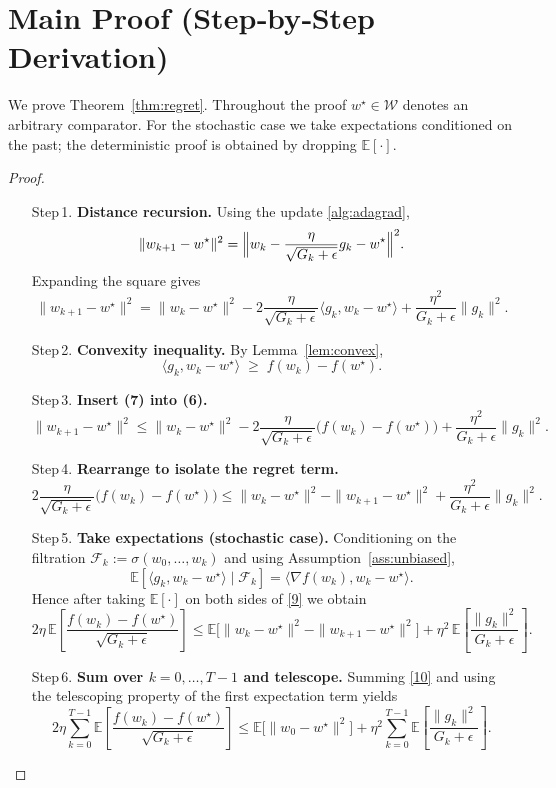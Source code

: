 \documentclass[11pt]{article}
\newcommand{\E}{\mathbb{E}}
\begin{document}
\section*{Main Proof (Step‑by‑Step Derivation)}
We prove Theorem~\ref{thm:regret}. Throughout the proof $w^{\star}\in\mathcal{W}$ denotes an arbitrary comparator.
For the stochastic case we take expectations conditioned on the past; the deterministic proof is obtained by dropping $\E[\cdot]$.

\begin{proof}
\begin{enumerate}
\item[Step 1.] \textbf{Distance recursion.}
Using the update \eqref{alg:adagrad},
\[
\|w_{k+1}-w^{\star}\|^{2}
= \Bigl\|w_k-\frac{\eta}{\sqrt{G_k+\epsilon}}g_k-w^{\star}\Bigr\|^{2}.
\]
Expanding the square gives
\[
\|w_{k+1}-w^{\star}\|^{2}
= \|w_k-w^{\star}\|^{2}
-2\frac{\eta}{\sqrt{G_k+\epsilon}}\langle g_k,w_k-w^{\star}\rangle
+\frac{\eta^{2}}{G_k+\epsilon}\|g_k\|^{2}.
\tag{6}
\]

\item[Step 2.] \textbf{Convexity inequality.}
By Lemma~\ref{lem:convex},
\[
\langle g_k,w_k-w^{\star}\rangle
\;\ge\;
f(w_k)-f(w^{\star}).
\tag{7}
\]

\item[Step 3.] \textbf{Insert (7) into (6).}
\[
\|w_{k+1}-w^{\star}\|^{2}
\le \|w_k-w^{\star}\|^{2}
-2\frac{\eta}{\sqrt{G_k+\epsilon}}\bigl(f(w_k)-f(w^{\star})\bigr)
+\frac{\eta^{2}}{G_k+\epsilon}\|g_k\|^{2}.
\tag{8}
\]

\item[Step 4.] \textbf{Rearrange to isolate the regret term.}
\[
2\frac{\eta}{\sqrt{G_k+\epsilon}}\bigl(f(w_k)-f(w^{\star})\bigr)
\le
\|w_k-w^{\star}\|^{2}
-\|w_{k+1}-w^{\star}\|^{2}
+\frac{\eta^{2}}{G_k+\epsilon}\|g_k\|^{2}.
\tag{9}
\]

\item[Step 5.] \textbf{Take expectations (stochastic case).}
Conditioning on the filtration $\mathcal{F}_k:=\sigma(w_0,\dots,w_k)$ and using
Assumption~\ref{ass:unbiased},
\[
\E\!\left[\langle g_k,w_k-w^{\star}\rangle\mid\mathcal{F}_k\right]
= \langle \nabla f(w_k),w_k-w^{\star}\rangle .
\]
Hence after taking $\E[\cdot]$ on both sides of \eqref{9} we obtain
\[
2\eta\,\E\!\left[\frac{f(w_k)-f(w^{\star})}{\sqrt{G_k+\epsilon}}\right]
\le
\E\!\bigl[\|w_k-w^{\star}\|^{2}-\|w_{k+1}-w^{\star}\|^{2}\bigr]
+\eta^{2}\,\E\!\left[\frac{\|g_k\|^{2}}{G_k+\epsilon}\right].
\tag{10}
\]

\item[Step 6.] \textbf{Sum over $k=0,\dots,T-1$ and telescope.}
Summing \eqref{10} and using the telescoping property of the first expectation term yields
\[
2\eta\sum_{k=0}^{T-1}\E\!\left[\frac{f(w_k)-f(w^{\star})}{\sqrt{G_k+\epsilon}}\right]
\le
\E\!\bigl[\|w_0-w^{\star}\|^{2}\bigr]
+\eta^{2}\sum_{k=0}^{T-1}\E\!\left[\frac{\|g_k\|^{2}}{G_k+\epsilon}\right].
\tag{11}
\]


\end{enumerate}
\end{proof}
\end{document}
